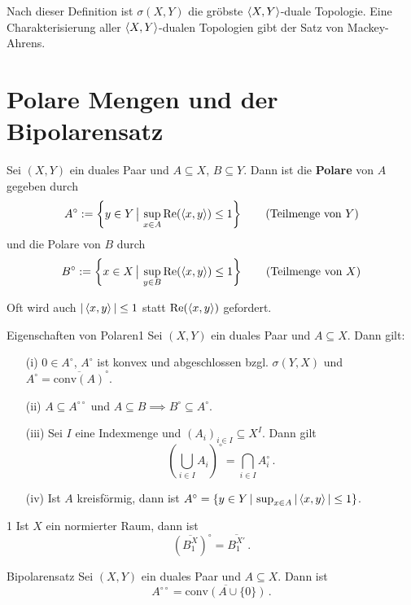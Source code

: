 \documentclass{article}
\begin{document}
	Nach dieser Definition ist $\sigma(X,Y)$ die gröbste $\left\langle X,Y\right\rangle$-duale Topologie. Eine Charakterisierung aller $\left\langle X,Y\right\rangle$-dualen Topologien gibt der Satz von Mackey-Ahrens.
	
	\section{Polare Mengen und der Bipolarensatz}
	
	\begin{Def}{}{}
		Sei $(X,Y)$ ein duales Paar und $A\subseteq X$, $B\subseteq Y$. Dann ist die \textbf{Polare} von $A$ gegeben durch
		\[A^{\circ}:=\left\{y\in Y\,\big|\,\sup_{x\in A}\operatorname{\textrm{Re}}(\left\langle x,y\right\rangle)\le 1\right\}\tag{Teilmenge von $Y$}\]
		und die Polare von $B$ durch
		\[B^{\circ}:=\left\{x\in X\,\big|\,\sup_{y\in B}\operatorname{\textrm{Re}}(\left\langle x,y\right\rangle)\le 1\right\}\tag{Teilmenge von $X$}\]
	\end{Def}
	
	{\selectfont{}\relax} Oft wird auch $|\left\langle x,y\right\rangle|\le 1$ statt $\operatorname{\textrm{Re}}(\left\langle x,y\right\rangle)$ gefordert.
	
	
	
	\begin{Lemma}{Eigenschaften von Polaren}{1}
		Sei $(X,Y)$ ein duales Paar und $A\subseteq X$. Dann gilt:
		\begin{itemize}
			\item[(i)] $0\in A^{\circ}$, $A^{\circ}$ ist konvex und abgeschlossen bzgl. $\sigma(Y,X)$ und $A^{\circ}=\overline{\mathrm{conv}(A)}^{\circ}$.
			\item[(ii)] $A\subseteq A^{\circ\circ}$ und $A\subseteq B\implies B^{\circ}\subseteq A^{\circ}$.
			\item[(iii)] Sei $I$ eine Indexmenge und $(A_i)_{i\in I}\subseteq X^I$. Dann gilt
			\[\left(\bigcup_{i\in I} A_i\right)^{\circ}=\bigcap_{i\in I}A_i^{\circ}\,.\]
			\item[(iv)] Ist $A$ kreisförmig, dann ist $A^{\circ}=\{y\in Y\,|\, \sup_{x\in A}|\left\langle x,y\right\rangle|\le 1\}$.
		\end{itemize}
	\end{Lemma}
	
	
	\begin{Beispiel}{}{1}
		 Ist $X$ ein normierter Raum, dann ist
			\[(\overline{B_1^X})^{\circ}=\overline{B_1^{X'}}\,.\]
	\end{Beispiel}
	
	
	
	\begin{Satz}{Bipolarensatz}{}
		Sei $(X,Y)$ ein duales Paar und $A\subseteq X$. Dann ist 
		\[A^{\circ\circ}=\overline{\mathrm{conv}(A\cup \{0\})}\,.\]
	\end{Satz}
	
\end{document}
